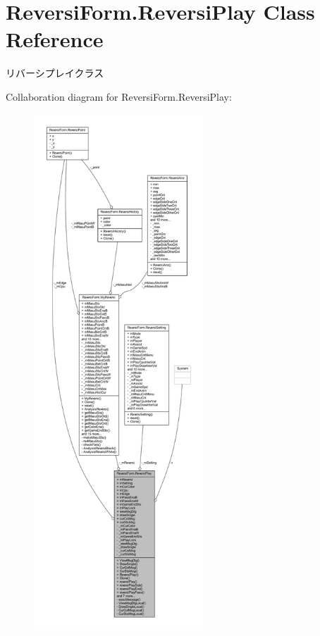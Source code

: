 \hypertarget{class_reversi_form_1_1_reversi_play}{}\section{Reversi\+Form.\+Reversi\+Play Class Reference}
\label{class_reversi_form_1_1_reversi_play}


リバーシプレイクラス  




Collaboration diagram for Reversi\+Form.\+Reversi\+Play\+:\nopagebreak
\begin{figure}[H]
\begin{center}
\leavevmode
\includegraphics[height=550pt]{class_reversi_form_1_1_reversi_play__coll__graph}
\end{center}
\end{figure}

